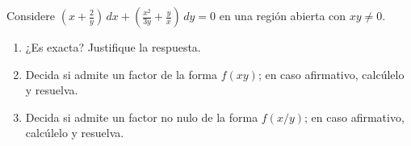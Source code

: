 Considere $\left(x+\frac2y\right)\,dx+\left(\frac{x^2}{3y}+\frac yx\right)\,dy=0$ en una región abierta con $xy\ne0$.

\begin{enumerate}[label=(\alph*),ref=\alph*,leftmargin=*]
\item ¿Es exacta? Justifique la respuesta.
\item Decida si admite un factor de la forma $f(xy)$; en caso afirmativo, calcúlelo y resuelva.
\item Decida si admite un factor no nulo de la forma $f(x/y)$; en caso afirmativo, calcúlelo y resuelva.
\end{enumerate}
